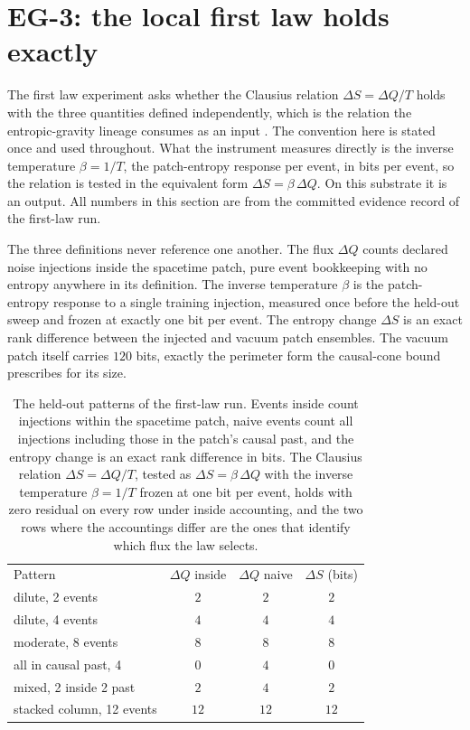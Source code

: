 \documentclass[aps,pre,reprint,nofootinbib]{revtex4-2}
\begin{document}
\section{EG-3: the local first law holds exactly}
\label{sec:eg3}

The first law experiment asks whether the Clausius relation
$\Delta S = \Delta Q / T$ holds with the three quantities defined
independently, which is the relation the entropic-gravity lineage
consumes as an input \cite{Jacobson1995, DorauMuch2026}.  The
convention here is stated once and used throughout.  What the
instrument measures directly is the inverse temperature
$\beta = 1/T$, the patch-entropy response per event, in bits per
event, so the relation is tested in the equivalent form
$\Delta S = \beta\,\Delta Q$.  On this substrate it is an output.
All numbers in this section are from the committed evidence record
of the first-law run.

The three definitions never reference one another.  The flux
$\Delta Q$ counts declared noise injections inside the spacetime
patch, pure event bookkeeping with no entropy anywhere in its
definition.  The inverse temperature $\beta$ is the patch-entropy
response to a single training injection, measured once before the
held-out sweep and frozen at exactly one bit per event.  The entropy
change
$\Delta S$ is an exact rank difference between the injected and
vacuum patch ensembles.  The vacuum patch itself carries $120$ bits,
exactly the perimeter form the causal-cone bound prescribes for its
size.

\begin{table}[t]
\caption{The held-out patterns of the first-law run.  Events inside
count injections within the spacetime patch, naive events count all
injections including those in the patch's causal past, and the
entropy change is an exact rank difference in bits.  The Clausius
relation $\Delta S = \Delta Q / T$, tested as
$\Delta S = \beta\,\Delta Q$ with the inverse temperature
$\beta = 1/T$ frozen at one bit per event, holds
with zero residual on every row under inside accounting, and the two
rows where the accountings differ are the ones that identify which
flux the law selects.}
\label{tab:firstlaw}
\begin{ruledtabular}
\begin{tabular}{lccc}
Pattern & $\Delta Q$ inside & $\Delta Q$ naive & $\Delta S$ (bits) \\
\colrule
dilute, 2 events            & $2$  & $2$  & $2$  \\
dilute, 4 events            & $4$  & $4$  & $4$  \\
moderate, 8 events          & $8$  & $8$  & $8$  \\
all in causal past, 4       & $0$  & $4$  & $0$  \\
mixed, 2 inside 2 past      & $2$  & $4$  & $2$  \\
stacked column, 12 events   & $12$ & $12$ & $12$ \\
\end{tabular}
\end{ruledtabular}
\end{table}
\end{document}
